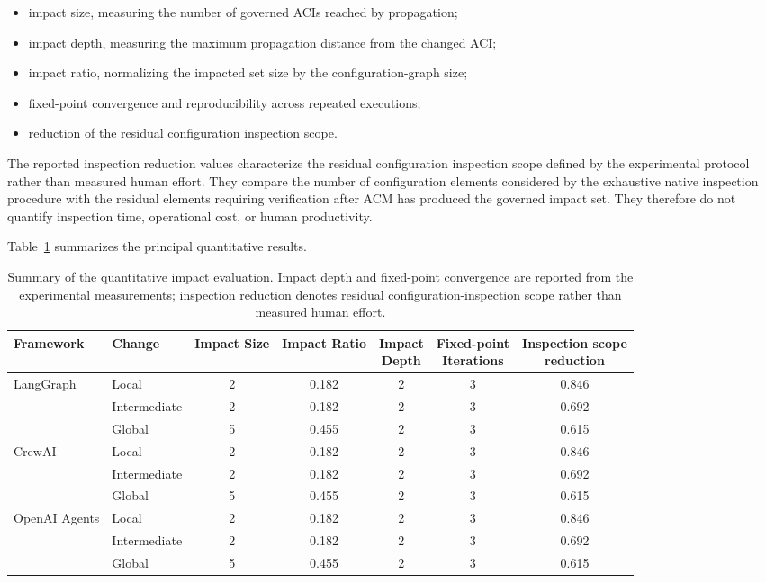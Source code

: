 \documentclass[10pt]{article}
\begin{document}
\begin{itemize} 
	\item impact size, measuring the number of governed ACIs reached by propagation; 
	\item impact depth, measuring the maximum propagation distance from the changed ACI; 
	\item impact ratio, normalizing the impacted set size by the configuration-graph size; 
	\item fixed-point convergence and reproducibility across repeated executions; 
	\item reduction of the residual configuration inspection scope. \end{itemize}

The reported inspection reduction values characterize the residual configuration inspection scope defined by the experimental protocol rather than measured human effort. They compare the number of configuration elements considered by the exhaustive native inspection procedure with the residual elements requiring verification after ACM has produced the governed impact set. They therefore do not quantify inspection time, operational cost, or human productivity.

Table~\ref{tab:impact_summary} summarizes the principal quantitative results.

\begin{table}[t]
	\centering
	\caption{Summary of the quantitative impact evaluation. Impact depth and fixed-point convergence are reported from the experimental measurements; inspection reduction denotes residual configuration-inspection scope rather than measured human effort.}
	\label{tab:impact_summary}
	\small
	\begin{tabular}{llccccc}
		\toprule
		Framework &
		Change &
		Impact Size &
		Impact Ratio &
		\makecell{Impact\\Depth} &
		\makecell{Fixed-point\\Iterations} &
		\makecell{Inspection scope\\reduction}
		\\
		\midrule
		LangGraph &
		Local &
		2 &
		0.182 &
		2 &
		3 &
		0.846
		\\
		&
		Intermediate &
		2 &
		0.182 &
		2 &
		3 &
		0.692
		\\
		&
		Global &
		5 &
		0.455 &
		2 &
		3 &
		0.615
		\\
		\midrule
		CrewAI &
		Local &
		2 &
		0.182 &
		2 &
		3 &
		0.846
		\\
		&
		Intermediate &
		2 &
		0.182 &
		2 &
		3 &
		0.692
		\\
		&
		Global &
		5 &
		0.455 &
		2 &
		3 &
		0.615
		\\
		\midrule
		OpenAI Agents &
		Local &
		2 &
		0.182 &
		2 &
		3 &
		0.846
		\\
		&
		Intermediate &
		2 &
		0.182 &
		2 &
		3 &
		0.692
		\\
		&
		Global &
		5 &
		0.455 &
		2 &
		3 &
		0.615
		\\
		\bottomrule
	\end{tabular}
\end{table}
\end{document}
